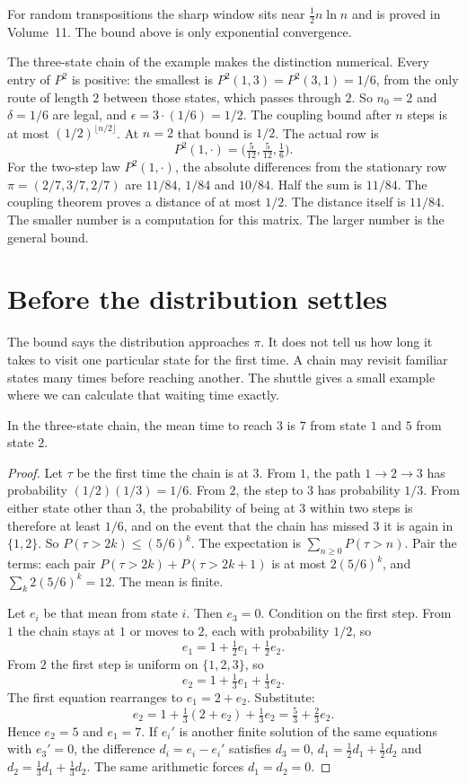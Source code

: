 For random transpositions the sharp window sits near $\frac12 n\ln n$ and is proved in Volume~11. The bound above is only exponential convergence.

The three-state chain of the example makes the distinction numerical. Every entry of $P^2$ is positive: the smallest is $P^2(1,3)=P^2(3,1)=1/6$, from the only route of length $2$ between those states, which passes through $2$. So $n_0=2$ and $\delta=1/6$ are legal, and $\epsilon=3\cdot(1/6)=1/2$. The coupling bound after $n$ steps is at most $(1/2)^{\lfloor n/2\rfloor}$. At $n=2$ that bound is $1/2$. The actual row is
\[
 P^2(1,\cdot)=\bigl(\tfrac{5}{12},\tfrac{5}{12},\tfrac16\bigr).
\]
For the two-step law $P^2(1,\cdot)$, the absolute differences from the stationary row $\pi=(2/7,3/7,2/7)$ are $11/84$, $1/84$ and $10/84$. Half the sum is $11/84$. The coupling theorem proves a distance of at most $1/2$. The distance itself is $11/84$. The smaller number is a computation for this matrix. The larger number is the general bound.

\section{Before the distribution settles}

The bound says the distribution approaches $\pi$. It does not tell us how long it takes to visit one particular state for the first time. A chain may revisit familiar states many times before reaching another. The shuttle gives a small example where we can calculate that waiting time exactly.

\begin{proposition}\label{prop:hit3}
In the three-state chain, the mean time to reach $3$ is $7$ from state $1$ and $5$ from state $2$.
\end{proposition}
\begin{proof}
Let $\tau$ be the first time the chain is at $3$. From $1$, the path $1\to2\to3$ has probability $(1/2)(1/3)=1/6$. From $2$, the step to $3$ has probability $1/3$. From either state other than $3$, the probability of being at $3$ within two steps is therefore at least $1/6$, and on the event that the chain has missed $3$ it is again in $\{1,2\}$. So $P(\tau>2k)\le(5/6)^k$. The expectation is $\sum_{n\ge0}P(\tau>n)$. Pair the terms: each pair $P(\tau>2k)+P(\tau>2k+1)$ is at most $2(5/6)^k$, and $\sum_k 2(5/6)^k=12$. The mean is finite.

Let $e_i$ be that mean from state $i$. Then $e_3=0$. Condition on the first step. From $1$ the chain stays at $1$ or moves to $2$, each with probability $1/2$, so
\[
 e_1=1+\tfrac12 e_1+\tfrac12 e_2.
\]
From $2$ the first step is uniform on $\{1,2,3\}$, so
\[
 e_2=1+\tfrac13 e_1+\tfrac13 e_2.
\]
The first equation rearranges to $e_1=2+e_2$. Substitute:
\[
 e_2=1+\tfrac13(2+e_2)+\tfrac13 e_2=\tfrac53+\tfrac23 e_2.
\]
Hence $e_2=5$ and $e_1=7$. If $e_i'$ is another finite solution of the same equations with $e_3'=0$, the difference $d_i=e_i-e_i'$ satisfies $d_3=0$, $d_1=\frac12 d_1+\frac12 d_2$ and $d_2=\frac13 d_1+\frac13 d_2$. The same arithmetic forces $d_1=d_2=0$.
\end{proof}

